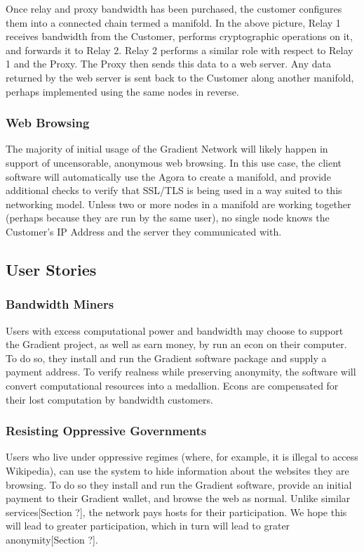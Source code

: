 \documentclass{article}
\begin{document}
Once relay and proxy bandwidth has been purchased, the customer configures them into a connected chain termed a manifold. In the above picture, Relay 1 receives bandwidth from the Customer, performs cryptographic operations on it, and forwards it to Relay 2. Relay 2 performs a similar role with respect to Relay 1 and the Proxy. The Proxy then sends this data to a web server. Any data returned by the web server is sent back to the Customer along another manifold, perhaps implemented using the same nodes in reverse.

\subsubsection{Web Browsing}

The majority of initial usage of the Gradient Network will likely happen in support of uncensorable, anonymous web browsing. In this use case, the client software will automatically use the Agora to create a manifold, and provide additional checks to verify that SSL/TLS is being used in a way suited to this networking model. Unless two or more nodes in a manifold are working together (perhaps because they are run by the same user), no single node knows the Customer's IP Address and the server they communicated with.

\subsection{User Stories}

\subsubsection{Bandwidth Miners}

Users with excess computational power and bandwidth may choose to support the Gradient project, as well as earn money, by run an econ on their computer. To do so, they install and run the Gradient software package and supply a payment address. To verify realness while preserving anonymity, the software will convert computational resources into a medallion. Econs are compensated for their lost computation by bandwidth customers.

\subsubsection{Resisting Oppressive Governments}

Users who live under oppressive regimes (where, for example, it is illegal to access Wikipedia), can use the system to hide information about the websites they are browsing. To do so they install and run the Gradient software, provide an initial payment to their Gradient wallet, and browse the web as normal. Unlike similar services[Section ?], the network pays hosts for their participation. We hope this will lead to greater participation, which in turn will lead to grater anonymity[Section ?].
\end{document}
